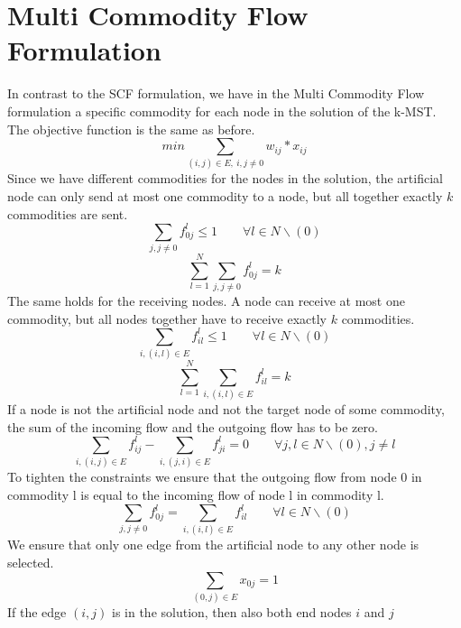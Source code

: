 \documentclass [11pt]{article}
\begin{document}
\section{Multi Commodity Flow Formulation}
In contrast to the SCF formulation, we have in the Multi Commodity Flow formulation
a specific commodity for each node in the solution of the k-MST.
The objective function is the same as before.
\begin{equation}
  min \sum_{(i,j) \in E , \ i,j \not = 0} {w_{ij} * x_{ij}}
\end{equation}
Since we have different commodities for the nodes in the solution,
the artificial node can only send at most one commodity to a node,
but all together exactly $k$ commodities are sent.
\begin{equation}
  \sum_{j, j \neq 0} {f_{0j}^{l}} \leq 1 \qquad \forall l \in N \backslash (0)
\end{equation}
\begin{equation}
  \sum_{l=1}^{N} \sum_{j, j \neq 0} {f_{0j}^{l}} = k
\end{equation}
The same holds for the receiving nodes.
A node can receive at most one commodity, but all nodes together
have to receive exactly $k$ commodities.
\begin{equation}
  \sum_{i,(i,l) \in E} {f_{il}^{l}} \leq 1 \qquad \forall l \in N \backslash (0)
\end{equation}
\begin{equation}
  \sum_{l=1}^{N} \sum_{i,(i,l) \in E} {f_{il}^{l}} = k
\end{equation}
If a node is not the artificial node and not the target node of some 
commodity, the sum of the incoming flow and the outgoing flow has to
be zero.
\begin{equation}
  \sum_{i, (i,j) \in E} {f_{ij}^{l}} - \sum_{i, (j,i) \in E} {f_{ji}^{l}} = 0 \qquad \forall j,l \in N \backslash (0), j \neq l
\end{equation}
To tighten the constraints we ensure that the outgoing flow from node 0
in commodity l is equal to the incoming flow of node l in commodity l.
\begin{equation}
  \sum_{j, j \neq 0} {f_{0j}^{l}} = \sum_{i, (i,l) \in E} {f_{il}^{l}} \qquad \forall l \in N \backslash (0)
\end{equation}
We ensure that only one edge from the artificial node to any
other node is selected.
\begin{equation}
\sum_{(0,j) \in E} x_{0j} = 1 
\end{equation}
If the edge $(i,j)$ is in the solution, then also both end nodes $i$ and $j$ 
\end{document}
